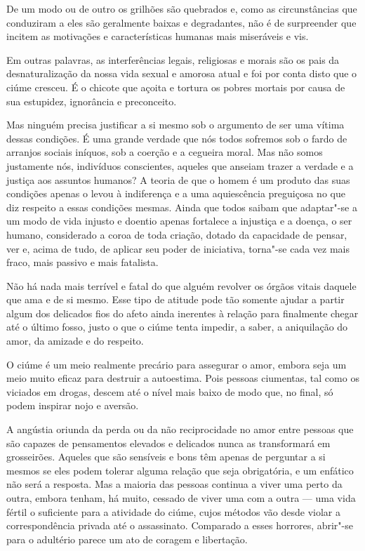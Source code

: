 De um modo ou de outro os grilhões são quebrados e, como as
circunstâncias que conduziram a eles são geralmente baixas e degradantes, não
é de surpreender que incitem as motivações e características humanas
mais miseráveis e vis.

Em outras palavras, as interferências legais, religiosas e morais são os
pais da desnaturalização da nossa vida sexual e amorosa atual e foi por
conta disto que o ciúme cresceu. É o chicote que açoita e tortura os
pobres mortais por causa de sua estupidez, ignorância e preconceito.

Mas ninguém precisa justificar a si mesmo sob o argumento de ser uma
vítima dessas condições. É uma grande verdade que nós todos sofremos sob
o fardo de arranjos sociais iníquos, sob a coerção e a cegueira moral.
Mas não somos justamente nós, indivíduos conscientes, aqueles que
anseiam trazer a verdade e a justiça aos assuntos humanos? A teoria de
que o homem é um produto das suas condições apenas o levou à indiferença
e a uma aquiescência preguiçosa no que diz respeito a essas condições
mesmas. Ainda que todos saibam que adaptar"-se a um modo de vida injusto
e doentio apenas fortalece a injustiça e a doença, o ser humano,
considerado a coroa de toda criação, dotado da capacidade de pensar, ver
e, acima de tudo, de aplicar seu poder de iniciativa, torna"-se cada vez
mais fraco, mais passivo e mais fatalista.

Não há nada mais terrível e fatal do que alguém revolver os órgãos
vitais daquele que ama e de si mesmo. Esse tipo de atitude pode tão
somente ajudar a partir algum dos delicados fios do afeto ainda inerentes à
relação para finalmente chegar até o último fosso, justo o que o ciúme
tenta impedir, a saber, a aniquilação do amor, da amizade e do respeito.

O ciúme é um meio realmente precário para assegurar o amor, embora seja
um meio muito eficaz para destruir a autoestima. Pois pessoas ciumentas,
tal como os viciados em drogas, descem até o nível mais baixo de modo
que, no final, só podem inspirar nojo e aversão.

A angústia oriunda da perda ou da não reciprocidade no amor entre
pessoas que são capazes de pensamentos elevados e delicados nunca as
transformará em grosseirões. Aqueles que são sensíveis e bons têm apenas
de perguntar a si mesmos se eles podem tolerar alguma relação que seja
obrigatória, e um enfático não será a resposta. Mas a maioria das
pessoas continua a viver uma perto da outra, embora tenham, há muito,
cessado de viver uma com a outra --- uma vida fértil o suficiente para a
atividade do ciúme, cujos métodos vão desde violar a correspondência
privada até o assassinato. Comparado a esses horrores, abrir"-se para o
adultério parece um ato de coragem e libertação.

